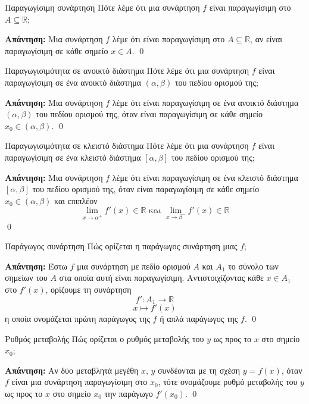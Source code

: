 \documentclass[a4paper, 12pt]{article}
\renewenvironment{proof}[1][\textbf{Απάντηση}]{%
  \par\noindent\textbf{#1:} \rmfamily}{\qed\par}
\begin{document}
\begin{theorem}{Παραγωγίσιμη συνάρτηση}
  Πότε λέμε ότι μια συνάρτηση $f$ είναι παραγωγίσιμη στο $A\subseteq \mathbb{R}$;
\end{theorem}
\begin{proof}
  Μια συνάρτηση $f$ λέμε ότι είναι παραγωγίσιμη στο $A\subseteq \mathbb{R}$, αν είναι παραγωγίσιμη σε κάθε σημείο $x\in A$.
\end{proof}

\begin{theorem}{Παραγωγισιμότητα σε ανοικτό διάστημα}
  Πότε λέμε ότι μια συνάρτηση $f$ είναι παραγωγίσιμη σε ένα ανοικτό διάστημα $(α,β)$ του πεδίου ορισμού της;
\end{theorem}
\begin{proof}
  Μια συνάρτηση $f$ λέμε ότι είναι παραγωγίσιμη σε ένα ανοικτό διάστημα $(α, β)$ του πεδίου ορισμού της, όταν είναι παραγωγίσιμη σε κάθε σημείο $x_0 \in (α , β )$.
\end{proof}

\begin{theorem}{Παραγωγισιμότητα σε κλειστό διάστημα}
  Πότε λέμε ότι μια συνάρτηση $f$ είναι παραγωγίσιμη σε ένα κλειστό διάστημα $[α, β]$ του πεδίου ορισμού της;
\end{theorem}
\begin{proof}
  Μια συνάρτηση $f$ λέμε ότι είναι παραγωγίσιμη σε ένα κλειστό διάστημα $[α, β]$ του πεδίου ορισμού της, όταν είναι παραγωγίσιμη σε κάθε σημείο $x_0 \in (α , β )$ και επιπλέον
  $$\lim_{x \to α^+} f'(x) \in \mathbb{R} \text{ και } \lim_{x \to β^-} f'(x) \in \mathbb{R}$$
\end{proof}

\begin{theorem}{Παράγωγος συνάρτηση}
  Πώς ορίζεται η παράγωγος συνάρτηση μιας $f$;
\end{theorem}
\begin{proof}
  Έστω $f$ μια συνάρτηση με πεδίο ορισμού $A$ και $A_1$ το σύνολο των σημείων του $A$ στα
  οποία αυτή είναι παραγωγίσιμη. Αντιστοιχίζοντας κάθε $x \in A_1$ στο $f'(x)$, ορίζουμε τη συνάρτηση
  $$f' : A_1 \to \mathbb{R}$$
  $$x \mapsto f'(x)$$
  η οποία ονομάζεται πρώτη παράγωγος της $f$ ή απλά παράγωγος της $f$.
\end{proof}

\begin{theorem}{Ρυθμός μεταβολής}
  Πώς ορίζεται ο ρυθμός μεταβολής του $y$ ως προς το $x$ στο σημείο $x_0$;
\end{theorem}
\begin{proof}
  Αν δύο μεταβλητά μεγέθη $x$, $y$ συνδέονται με τη σχέση $y = f ( x)$, όταν $f$ είναι μια συνάρτηση παραγωγίσιμη στο $x_0$, τότε ονομάζουμε ρυθμό μεταβολής του $y$ ως προς το $x$ στο σημείο $x_0$ την παράγωγο $f'(x_0)$.
\end{proof}
\end{document}
